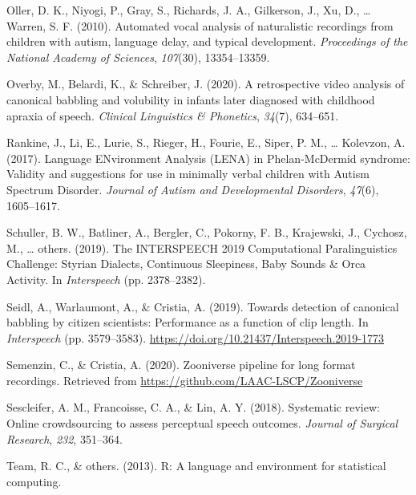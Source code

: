 \documentclass[english,,man]{apa6}
\begin{document}
\leavevmode\hypertarget{ref-oller2010automated}{}%
Oller, D. K., Niyogi, P., Gray, S., Richards, J. A., Gilkerson, J., Xu, D., \ldots{} Warren, S. F. (2010). Automated vocal analysis of naturalistic recordings from children with autism, language delay, and typical development. \emph{Proceedings of the National Academy of Sciences}, \emph{107}(30), 13354--13359.

\leavevmode\hypertarget{ref-overby2020retrospective}{}%
Overby, M., Belardi, K., \& Schreiber, J. (2020). A retrospective video analysis of canonical babbling and volubility in infants later diagnosed with childhood apraxia of speech. \emph{Clinical Linguistics \& Phonetics}, \emph{34}(7), 634--651.

\leavevmode\hypertarget{ref-rankine2017language}{}%
Rankine, J., Li, E., Lurie, S., Rieger, H., Fourie, E., Siper, P. M., \ldots{} Kolevzon, A. (2017). Language ENvironment Analysis (LENA) in Phelan-McDermid syndrome: Validity and suggestions for use in minimally verbal children with Autism Spectrum Disorder. \emph{Journal of Autism and Developmental Disorders}, \emph{47}(6), 1605--1617.

\leavevmode\hypertarget{ref-schuller2019interspeech}{}%
Schuller, B. W., Batliner, A., Bergler, C., Pokorny, F. B., Krajewski, J., Cychosz, M., \ldots{} others. (2019). The INTERSPEECH 2019 Computational Paralinguistics Challenge: Styrian Dialects, Continuous Sleepiness, Baby Sounds \& Orca Activity. In \emph{Interspeech} (pp. 2378--2382).

\leavevmode\hypertarget{ref-Seidl19}{}%
Seidl, A., Warlaumont, A., \& Cristia, A. (2019). Towards detection of canonical babbling by citizen scientists: Performance as a function of clip length. In \emph{Interspeech} (pp. 3579--3583). \url{https://doi.org/10.21437/Interspeech.2019-1773}

\leavevmode\hypertarget{ref-semenzin2020zooniverse}{}%
Semenzin, C., \& Cristia, A. (2020). Zooniverse pipeline for long format recordings. Retrieved from \url{https://github.com/LAAC-LSCP/Zooniverse}

\leavevmode\hypertarget{ref-sescleifer2018systematic}{}%
Sescleifer, A. M., Francoisse, C. A., \& Lin, A. Y. (2018). Systematic review: Online crowdsourcing to assess perceptual speech outcomes. \emph{Journal of Surgical Research}, \emph{232}, 351--364.

\leavevmode\hypertarget{ref-team2013r}{}%
Team, R. C., \& others. (2013). R: A language and environment for statistical computing.
\end{document}
